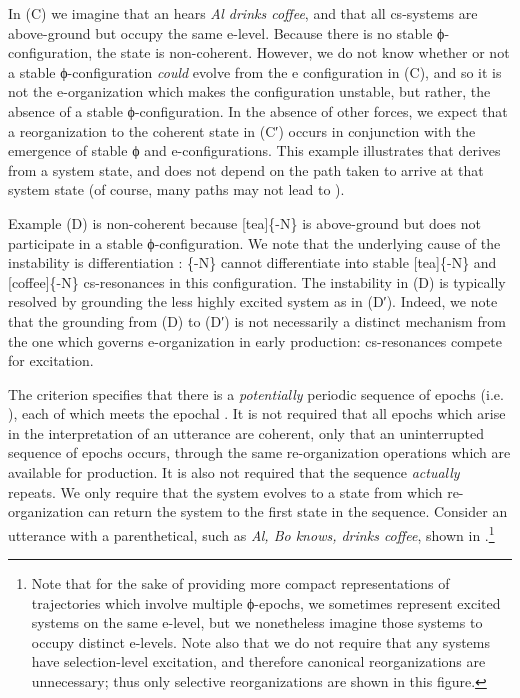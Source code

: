   In (C) we imagine that an  hears \textit{Al drinks coffee}, and that all cs-systems are above-ground but occupy the same e-level. Because there is no stable ϕ-configuration, the state is non-coherent. However, we do not know whether or not a stable ϕ-configuration \textit{could} evolve from the e configuration in (C), and so it is not the e-organization which makes the configuration unstable, but rather, the absence of a stable ϕ-configuration. In the absence of other forces, we expect that a reorganization to the coherent state in (C′) occurs in conjunction with the emergence of stable ϕ and e-configurations. This example illustrates that  derives from a system state, and does not depend on the path taken to arrive at that system state (of course, many paths may not lead to ). 

  Example (D) is non-coherent because [tea]\{-N\} is above-ground but does not participate in a stable ϕ-configuration. We note that the underlying cause of the instability is differentiation : \{-N\} cannot differentiate into stable [tea]\{-N\} and [coffee]\{-N\} cs-resonances in this configuration. The instability in (D) is typically resolved by grounding the less highly excited system as in (D′). Indeed, we note that the grounding from (D) to (D′) is not necessarily a distinct mechanism from the one which governs e-organization in early production: cs-resonances compete for excitation.

The  criterion specifies that there is a \textit{potentially} periodic sequence of epochs (i.e. ), each of which meets the epochal . It is not required that all epochs which arise in the interpretation of an utterance are coherent, only that an uninterrupted sequence of epochs occurs, through the same re-organization operations which are available for production. It is also not required that the sequence \textit{actually} repeats. We only require that the  system evolves to a state from which re-organization can return the system to the first state in the sequence. Consider an utterance with a parenthetical, such as \textit{Al, Bo knows, drinks coffee}, shown in {}.\footnote{Note that for the sake of providing more compact representations of trajectories which involve multiple ϕ-epochs, we sometimes represent excited systems on the same e-level, but we nonetheless imagine those systems to occupy distinct e-levels. Note also that we do not require that any systems have selection-level excitation, and therefore canonical reorganizations are unnecessary; thus only selective reorganizations are shown in this figure.}

